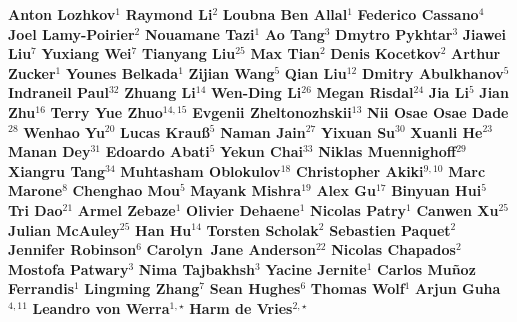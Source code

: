 \begin{center}
\textbf{Anton Lozhkov}$^1$\quad
\textbf{Raymond Li}$^2$\quad
\textbf{Loubna Ben Allal}$^1$\quad
\textbf{Federico Cassano}$^4$\quad
\textbf{Joel Lamy-Poirier}$^2$\quad
\textbf{Nouamane Tazi}$^1$\quad
\textbf{Ao Tang}$^3$\quad
\textbf{Dmytro Pykhtar}$^3$\quad
\textbf{Jiawei Liu}$^7$\quad
\textbf{Yuxiang Wei}$^7$\quad
\textbf{Tianyang Liu}$^{25}$\quad
\textbf{Max Tian}$^2$\quad
\textbf{Denis Kocetkov}$^2$\quad
\textbf{Arthur Zucker}$^1$\quad
\textbf{Younes Belkada}$^1$\quad
\textbf{Zijian Wang}$^5$\quad
\textbf{Qian Liu}$^{12}$\quad
\textbf{Dmitry Abulkhanov}$^5$\quad
\textbf{Indraneil Paul}$^{32}$\quad
\textbf{Zhuang Li}$^{14}$\quad
\textbf{Wen-Ding Li}$^{26}$\quad
\textbf{Megan Risdal}$^{24}$\quad
\textbf{Jia Li}$^5$\quad
\textbf{Jian Zhu}$^{16}$\quad
\textbf{Terry Yue Zhuo}$^{14,15}$\quad
\textbf{Evgenii Zheltonozhskii}$^{13}$\quad
\textbf{Nii Osae Osae Dade}$^{28}$\quad
\textbf{Wenhao Yu}$^{20}$\quad
\textbf{Lucas Krauß}$^5$\quad
\textbf{Naman Jain}$^{27}$\quad
\textbf{Yixuan Su}$^{30}$\quad
\textbf{Xuanli He}$^{23}$\quad
\textbf{Manan Dey}$^{31}$\quad
\textbf{Edoardo Abati}$^5$\quad
\textbf{Yekun Chai}$^{33}$\quad
\textbf{Niklas Muennighoff}$^{29}$\quad
\textbf{Xiangru Tang}$^34$\quad
\textbf{Muhtasham Oblokulov}$^{18}$\quad
\textbf{Christopher Akiki}$^{9,10}$\quad
\textbf{Marc Marone}$^8$\quad
\textbf{Chenghao Mou}$^5$\quad
\textbf{Mayank Mishra}$^{19}$\quad
\textbf{Alex Gu}$^{17}$\quad
\textbf{Binyuan Hui}$^{5}$\quad
\textbf{Tri Dao}$^{21}$\quad
\textbf{Armel Zebaze}$^1$\quad
\textbf{Olivier Dehaene}$^1$\quad
\textbf{Nicolas Patry}$^1$\quad
\textbf{Canwen Xu}$^{25}$\quad
\textbf{Julian McAuley}$^{25}$\quad
\textbf{Han Hu}$^{14}$\quad%
\textbf{Torsten Scholak}$^2$\quad
\textbf{Sebastien Paquet}$^2$\quad
\textbf{Jennifer Robinson}$^6$\quad
\textbf{Carolyn~Jane Anderson}$^{22}$\quad
\textbf{Nicolas Chapados}$^2$\quad
\textbf{Mostofa Patwary}$^3$\quad
\textbf{Nima Tajbakhsh}$^3$\quad
\textbf{Yacine Jernite}$^1$\quad
\textbf{Carlos Muñoz Ferrandis}$^1$\quad
\textbf{Lingming Zhang}$^7$\quad
\textbf{Sean Hughes}$^6$\quad
\textbf{Thomas Wolf}$^1$\quad
\textbf{Arjun Guha}$^{4,11}$\quad
\textbf{Leandro von Werra}$^{1, \star}$\quad
\textbf{Harm de Vries}$^{2, \star}$\quad


\end{center}
